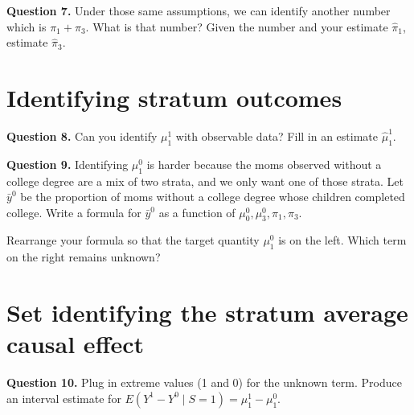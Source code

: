 \documentclass[10pt]{article}
\begin{document}
\textbf{Question 7.} Under those same assumptions, we can identify another number which is $\pi_1 + \pi_3$. What is that number? Given the number and your estimate $\hat\pi_1$, estimate $\hat\pi_3$.

\section*{Identifying stratum outcomes}

\textbf{Question 8.} Can you identify $\mu^1_1$ with observable data? Fill in an estimate $\hat\mu^1_1$.

\textbf{Question 9.} Identifying $\mu^0_1$ is harder because the moms observed without a college degree are a mix of two strata, and we only want one of those strata. Let $\bar{y}^0$ be the proportion of moms without a college degree whose children completed college. Write a formula for $\bar{y}^0$ as a function of $\mu^0_0,\mu^0_3,\pi_1,\pi_3$.

Rearrange your formula so that the target quantity $\mu^0_1$ is on the left. Which term on the right remains unknown?

\section*{Set identifying the stratum average causal effect}

\textbf{Question 10.} Plug in extreme values (1 and 0) for the unknown term. Produce an interval estimate for $E(Y^1 - Y^0\mid S = 1) = \mu^1_1 - \mu^0_1$.
\end{document}
